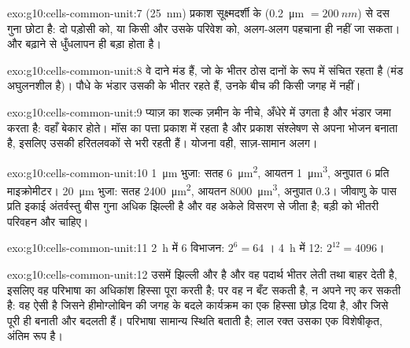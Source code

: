 \begin{solution}{exo:g10:cells-common-unit:7}
 (\qty{25}{nm}) प्रकाश सूक्ष्मदर्शी के 
(\qty{0.2}{\micro m} $= \qty{200}{nm}$) से दस गुना छोटा है: दो पड़ोसी
 को, या किसी  और उसके परिवेश को, अलग-अलग पहचाना ही
नहीं जा सकता। और  बढ़ाने से धुँधलापन ही बड़ा होता है।
\end{solution}

\begin{solution}{exo:g10:cells-common-unit:8}
वे दाने मंड हैं, जो  के भीतर ठोस दानों के रूप में संचित रहता है
(मंड अघुलनशील है)। पौधे के भंडार उसकी  के भीतर रहते हैं, उनके
बीच की किसी जगह में नहीं।
\end{solution}

\begin{solution}{exo:g10:cells-common-unit:9}
प्याज़ का शल्क ज़मीन के नीचे, अँधेरे में उगता है और भंडार जमा करता है:
वहाँ  बेकार होते। मॉस का पत्ता प्रकाश में रहता है और प्रकाश
संश्लेषण से अपना भोजन बनाता है, इसलिए उसकी  हरितलवकों से भरी
रहती हैं। योजना वही, साज़-सामान अलग।
\end{solution}

\begin{solution}{exo:g10:cells-common-unit:10}
\qty{1}{\micro m} भुजा: सतह \qty{6}{\micro m^2}, आयतन
\qty{1}{\micro m^3}, अनुपात 6 प्रति माइक्रोमीटर। \qty{20}{\micro m}
भुजा: सतह \qty{2400}{\micro m^2}, आयतन \qty{8000}{\micro m^3}, अनुपात
0.3। जीवाणु के पास प्रति इकाई अंतर्वस्तु बीस गुना अधिक झिल्ली है और वह
अकेले विसरण से जीता है; बड़ी  को भीतरी परिवहन और  चाहिए।
\end{solution}

\begin{solution}{exo:g10:cells-common-unit:11}
\qty{2}{h} में 6 विभाजन: $2^6 = 64$ । \qty{4}{h} में 12:
$2^{12} = 4096$।
\end{solution}

\begin{solution}{exo:g10:cells-common-unit:12}
उसमें झिल्ली और  है और वह पदार्थ भीतर लेती तथा बाहर देती है,
इसलिए वह परिभाषा का अधिकांश हिस्सा पूरा करती है; पर वह न बँट सकती है, न
अपने  नए कर सकती है: वह ऐसी  है जिसने हीमोग्लोबिन की जगह के
बदले कार्यक्रम का एक हिस्सा छोड़ दिया है, और जिसे पूरी  ही बनाती
और बदलती हैं। परिभाषा सामान्य स्थिति बताती है; लाल रक्त  उसका एक
विशेषीकृत, अंतिम रूप है।
\end{solution}

